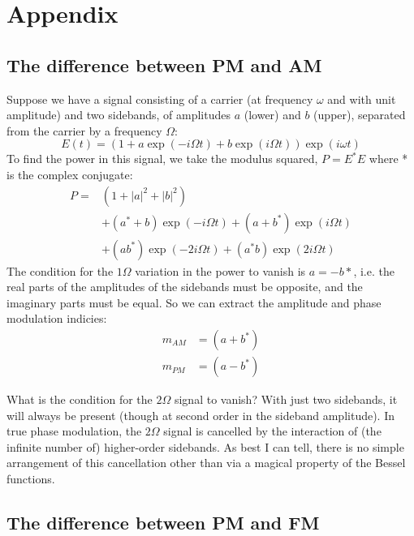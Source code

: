 \chapter{Appendix}
\label{chapter7}

\section{The difference between PM and AM}
\label{sec:am-vs-pm}
%
Suppose we have a signal consisting of a carrier (at frequency $\omega$ and
with unit amplitude) and two sidebands, of amplitudes $a$ (lower) and $b$
(upper), separated from the carrier by a frequency $\Omega$:
%
\begin{equation}
E(t) = \left(1 + a \exp(-i \Omega t) + b \exp(i \Omega t)\right)
\exp(i \omega t)
\end{equation}
%
To find the power in this signal, we take the
modulus squared, $P = E^*E$ where * is the complex conjugate:
%
\begin{equation}
\begin{split}
P = & \left(1 + |a|^2 + |b|^2\right) \\
    & + \left(a^* + b\right) \exp(-i \Omega t) + \left(a + b^*\right) \exp(i \Omega t) \\
    & + \left(ab^*\right) \exp(-2 i \Omega t) + \left(a^*b\right) \exp(2 i \Omega t)
\end{split}
\end{equation}
%
The condition for the $1\Omega$ variation in the power to vanish is
$a=-b*$, i.e. the real parts of the amplitudes of the sidebands must
be opposite, and the imaginary parts must be equal. So we can extract
the amplitude and phase modulation indicies:
%
\begin{equation}
\begin{split}
m_{AM} &= (a + b^*)\\
m_{PM} &= (a - b^*)
\end{split}
\end{equation}

What is the condition for the $2\Omega$ signal to vanish? With just
two sidebands, it will always be present (though at second order in
the sideband amplitude). In true phase modulation, the $2\Omega$
signal is cancelled by the interaction of (the infinite number of)
higher-order sidebands. As best I can tell, there is no simple
arrangement of this cancellation other than via a magical property of
the Bessel functions.

\section{The difference between PM and FM}


